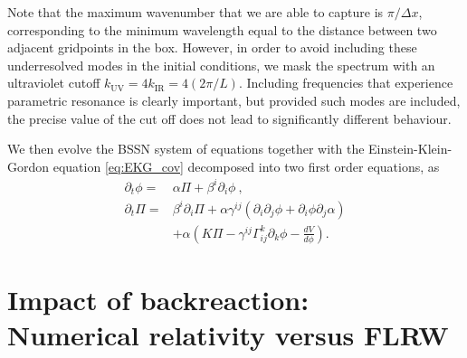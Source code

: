 \documentclass[
    reprint,
    preprintnumbers,
    superscriptaddress,
    nofootinbib,
     amsmath,amssymb,
     aps,
     prd,
    floatfix,
    ]{revtex4-2}
\begin{document}
Note that the maximum wavenumber that we are able to capture is $\pi/\Delta x$, corresponding to the minimum wavelength equal to the distance between two adjacent gridpoints in the box. However, in order to avoid including these underresolved modes in the initial conditions, we mask the spectrum with an ultraviolet cutoff $k_\mathrm{UV}=4 k_\mathrm{IR}=4(2\pi/L)$. Including frequencies that experience parametric resonance is clearly important, but provided such modes are included, the precise value of the cut off does not lead to significantly different behaviour.


We then evolve the BSSN system of equations \cite{Nakamura:1987zz,Shibata:1995we,Baumgarte:1998te} together with the Einstein-Klein-Gordon equation \eqref{eq:EKG_cov} decomposed into two first order equations, as
\begin{align}
    \label{eq:EKG1}\partial_t \phi  =& \alpha\Pi +\beta^i\partial_i\phi~, \\
    \partial_t \Pi =& \beta^i\partial_i\Pi + \alpha\gamma^{ij}(\partial_i \partial_j \phi +\partial_i\phi \partial_j \alpha) \nonumber\\
    &+ \alpha\left(K\Pi - \gamma^{ij}\Gamma^k_{ij}\partial_k\phi - \frac{dV}{d\phi}\right) . \label{eq:EKG2}
\end{align}



\section{Impact of backreaction:\\ Numerical relativity versus FLRW}
\label{app:FLRW}
\end{document}
